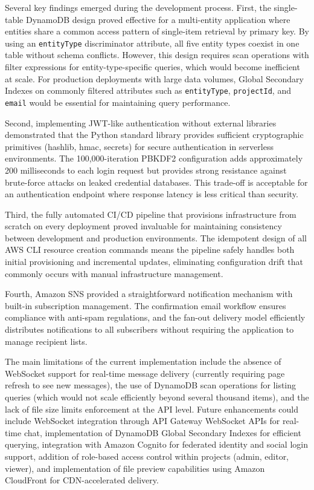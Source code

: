 \documentclass[conference]{IEEEtran}
\begin{document}
Several key findings emerged during the development process. First, the single-table DynamoDB design proved effective for a multi-entity application where entities share a common access pattern of single-item retrieval by primary key. By using an \texttt{entityType} discriminator attribute, all five entity types coexist in one table without schema conflicts. However, this design requires scan operations with filter expressions for entity-type-specific queries, which would become inefficient at scale. For production deployments with large data volumes, Global Secondary Indexes on commonly filtered attributes such as \texttt{entityType}, \texttt{projectId}, and \texttt{email} would be essential for maintaining query performance.

Second, implementing JWT-like authentication without external libraries demonstrated that the Python standard library provides sufficient cryptographic primitives (hashlib, hmac, secrets) for secure authentication in serverless environments. The 100,000-iteration PBKDF2 configuration adds approximately 200 milliseconds to each login request but provides strong resistance against brute-force attacks on leaked credential databases. This trade-off is acceptable for an authentication endpoint where response latency is less critical than security.

Third, the fully automated CI/CD pipeline that provisions infrastructure from scratch on every deployment proved invaluable for maintaining consistency between development and production environments. The idempotent design of all AWS CLI resource creation commands means the pipeline safely handles both initial provisioning and incremental updates, eliminating configuration drift that commonly occurs with manual infrastructure management.

Fourth, Amazon SNS provided a straightforward notification mechanism with built-in subscription management. The confirmation email workflow ensures compliance with anti-spam regulations, and the fan-out delivery model efficiently distributes notifications to all subscribers without requiring the application to manage recipient lists.

The main limitations of the current implementation include the absence of WebSocket support for real-time message delivery (currently requiring page refresh to see new messages), the use of DynamoDB scan operations for listing queries (which would not scale efficiently beyond several thousand items), and the lack of file size limits enforcement at the API level. Future enhancements could include WebSocket integration through API Gateway WebSocket APIs for real-time chat, implementation of DynamoDB Global Secondary Indexes for efficient querying, integration with Amazon Cognito for federated identity and social login support, addition of role-based access control within projects (admin, editor, viewer), and implementation of file preview capabilities using Amazon CloudFront for CDN-accelerated delivery.
\end{document}
